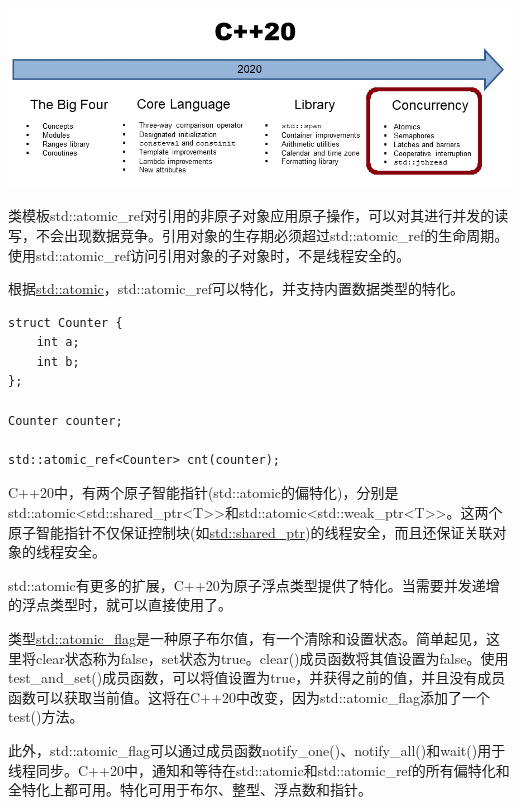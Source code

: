 
\begin{center}
\includegraphics[width=1.0\textwidth]{content/2/chapter3/images/7.png}\\
\end{center}


类模板std::atomic\_ref对引用的非原子对象应用原子操作，可以对其进行并发的读写，不会出现数据竞争。引用对象的生存期必须超过std::atomic\_ref的生命周期。使用std::atomic\_ref访问引用对象的子对象时，不是线程安全的。

根据\href{https://en.cppreference.com/w/cpp/atomic/atomic}{std::atomic}，std::atomic\_ref可以特化，并支持内置数据类型的特化。

\begin{lstlisting}[style=styleCXX]
struct Counter {
	int a;
	int b;
};

Counter counter;

std::atomic_ref<Counter> cnt(counter);
\end{lstlisting}

C++20中，有两个原子智能指针(std::atomic的偏特化)，分别是std::atomic<std::shared\_ptr<T>>和std::atomic<std::weak\_ptr<T>>。这两个原子智能指针不仅保证控制块(如\href{https://en.cppreference.com/w/cpp/memory/shared_ptr}{std::shared\_ptr})的线程安全，而且还保证关联对象的线程安全。

std::atomic有更多的扩展，C++20为原子浮点类型提供了特化。当需要并发递增的浮点类型时，就可以直接使用了。

类型\href{https://en.cppreference.com/w/cpp/atomic/atomic_flag}{std::atomic\_flag}是一种原子布尔值，有一个清除和设置状态。简单起见，这里将clear状态称为false，set状态为true。clear()成员函数将其值设置为false。使用test\_and\_set()成员函数，可以将值设置为true，并获得之前的值，并且没有成员函数可以获取当前值。这将在C++20中改变，因为std::atomic\_flag添加了一个test()方法。

此外，std::atomic\_flag可以通过成员函数notify\_one()、notify\_all()和wait()用于线程同步。C++20中，通知和等待在std::atomic和std::atomic\_ref的所有偏特化和全特化上都可用。特化可用于布尔、整型、浮点数和指针。

